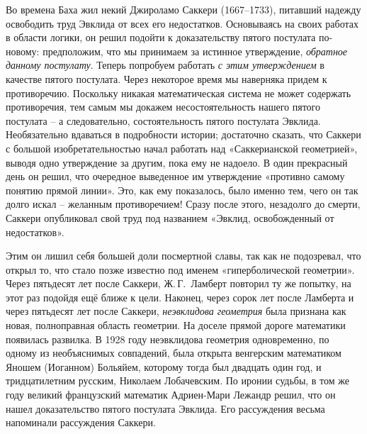 \documentclass[../main.tex]{subfiles}
\begin{document}
Во времена Баха жил некий Джироламо Саккери (1667--1733), питавший надежду освободить труд Эвклида от всех его недостатков. Основываясь на своих работах в области логики, он решил подойти к доказательству пятого постулата по-новому: предположим, что мы принимаем за истинное утверждение, \emph{обратное данному постулату}. Теперь попробуем работать \emph{с этим утверждением} в качестве пятого постулата. Через некоторое время мы наверняка придем к противоречию. Поскольку никакая математическая система не может содержать противоречия, тем самым мы докажем несостоятельность нашего пятого постулата \--- а следовательно, состоятельность пятого постулата Эвклида. Необязательно вдаваться в подробности истории; достаточно сказать, что Саккери с большой изобретательностью начал работать над «Саккерианской геометрией», выводя одно утверждение за другим, пока ему не надоело. В один прекрасный день он решил, что очередное выведенное им утверждение «противно самому понятию прямой линии». Это, как ему показалось, было именно тем, чего он так долго искал \--- желанным противоречием! Сразу после этого, незадолго до смерти, Саккери опубликовал свой труд под названием «Эвклид, освобожденный от недостатков».

Этим он лишил себя большей доли посмертной славы, так как не подозревал, что открыл то, что стало позже известно под именем «гиперболической геометрии». Через пятьдесят лет после Саккери, Ж.\,Г.~Ламберт повторил ту же попытку, на этот раз подойдя ещё ближе к цели. Наконец, через сорок лет после Ламберта и через пятьдесят лет после Саккери, \emph{неэвклидова геометрия} была признана как новая, полноправная область геометрии. На доселе прямой дороге математики появилась развилка. В 1928 году неэвклидова геометрия одновременно, по одному из необъяснимых совпадений, была открыта венгерским математиком Яношем (Иоганном) Больяйем, которому тогда был двадцать один год, и тридцатилетним русским, Николаем Лобачевским. По иронии судьбы, в том же году великий французский математик Адриен-Мари Лежандр решил, что он нашел доказательство пятого постулата Эвклида. Его рассуждения весьма напоминали рассуждения Саккери.
\end{document}
